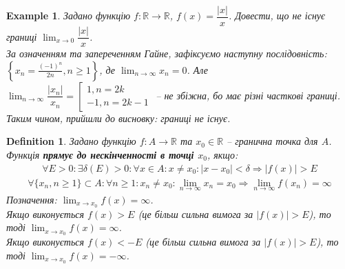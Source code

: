 \documentclass[a4paper, 14pt]{article}
\theoremstyle{theoremdd}
\theoremstyle{theoremdd}
\newtheorem{definition}[theorem]{Definition}
\theoremstyle{theoremdd}
\theoremstyle{theoremdd}
\newtheorem{example}[theorem]{Example}
\theoremstyle{theoremdd}
\theoremstyle{theoremdd}
\theoremstyle{theoremdd}
\theoremstyle{theoremdd}
\begin{document}
	\begin{example}
	Задано функцію $f \colon \mathbb{R} \to \mathbb{R}$, $f(x) = \dfrac{|x|}{x}$. Довести, що не існує границі $\displaystyle \lim_{x \to 0} \dfrac{|x|}{x}$.\\
	За означенням та запереченням Гайне, зафіксуємо наступну послідовність: $\displaystyle \left\{x_n = \frac{(-1)^n}{2n}, n \geq 1\right\}$, де $\displaystyle \lim_{n \to \infty} x_n = 0$. Але $\displaystyle \lim_{n \to \infty} \dfrac{|x_n|}{x_n} = \left[ \begin{gathered} 1, n = 2k \\ -1, n = 2k-1 \end{gathered} \right.$ -- не збіжна, бо має різні часткові границі.\\
	Таким чином, прийшли до висновку: границі не існує.
\\ %
	\end{example}
	
		\begin{definition}
	Задано функцію $f \colon A \to \mathbb{R}$ та $x_0 \in \mathbb{R}$ -- гранична точка для $A$.\\
	Функція \textbf{прямує до нескінченності в точці $x_0$}, якщо:
	\begin{align*}
	\forall E > 0: \exists \delta(E) > 0: \forall x \in A: x \neq x_0: |x-x_0|<\delta \Rightarrow |f(x)|>E \tag*{означення Коші}
	\end{align*}
	\begin{align*}
	\forall \{x_n, n \geq 1\}\subset A: \forall n \geq 1: x_n \neq x_0: \lim_{n \to \infty} x_n = x_0 \Rightarrow \lim_{n \to \infty} f(x_n) = \infty \tag*{означення Гайне}
	\end{align*}
	Позначення: $\displaystyle \lim_{x \to x_0} f(x) = \infty$.\\
	Якщо виконується $f(x) > E$ (це більш сильна вимога за $|f(x)| > E$), то тоді $\displaystyle \lim_{x \to x_0} f(x) = \infty$.\\
	Якщо виконується $f(x) < -E$ (це більш сильна вимога за $|f(x)| > E$), то тоді $\displaystyle \lim_{x \to x_0} f(x) = -\infty$.
	\end{definition}
	
\end{document}
